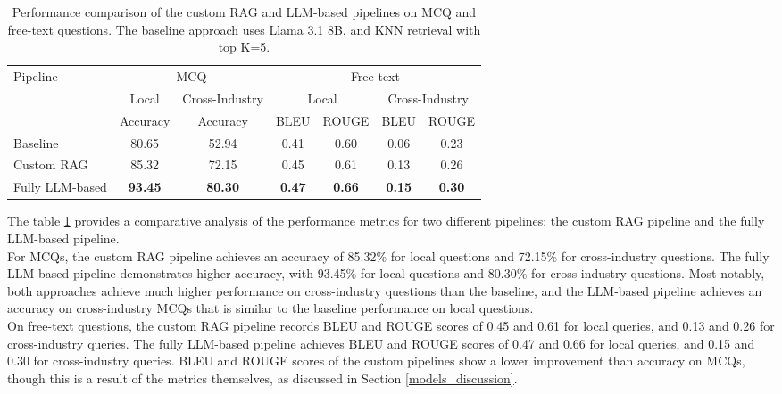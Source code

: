 \begin{table}[H]
\centering
\begin{tabular}{lcccccc}
\hline
\multirow{2}{*}{Pipeline} & \multicolumn{2}{c}{MCQ} & \multicolumn{4}{c}{Free text} \\ \cline{2-7} 
 & Local & Cross-Industry & \multicolumn{2}{c}{Local} & \multicolumn{2}{c}{Cross-Industry} \\  
 & Accuracy & Accuracy & BLEU & ROUGE & BLEU & ROUGE \\ \hline
Baseline        & 80.65 & 52.94 & 0.41 & 0.60 & 0.06 & 0.23 \\
Custom RAG & 85.32 & 72.15 & 0.45 & 0.61 & 0.13 & 0.26 \\
Fully LLM-based & \textbf{93.45} & \textbf{80.30} & \textbf{0.47} & \textbf{0.66} & \textbf{0.15} & \textbf{0.30} \\ \hline
\end{tabular}
\caption{Performance comparison of the custom RAG and LLM-based pipelines on MCQ and free-text questions. The baseline approach uses Llama 3.1 8B, and KNN retrieval with top K=5.}
\label{tab:proposed-pipelines}
\end{table}

The table \ref{tab:proposed-pipelines} provides a comparative analysis of the performance metrics for two different pipelines: the custom RAG pipeline and the fully LLM-based pipeline.\\ 

For MCQs, the custom RAG pipeline achieves an accuracy of 85.32\% for local questions and 72.15\% for cross-industry questions. The fully LLM-based pipeline demonstrates higher accuracy, with 93.45\% for local questions and 80.30\% for cross-industry questions. Most notably, both approaches achieve much higher performance on cross-industry questions than the baseline, and the LLM-based pipeline achieves an accuracy on cross-industry MCQs that is similar to the baseline performance on local questions.\\

On free-text questions, the custom RAG pipeline records BLEU and ROUGE scores of 0.45 and 0.61 for local queries, and 0.13 and 0.26 for cross-industry queries. The fully LLM-based pipeline achieves BLEU and ROUGE scores of 0.47 and 0.66 for local queries, and 0.15 and 0.30 for cross-industry queries. BLEU and ROUGE scores of the custom pipelines show a lower improvement than accuracy on MCQs, though this is a result of the metrics themselves, as discussed in Section \ref{models_discussion}. \\

